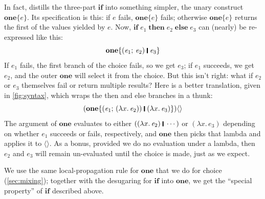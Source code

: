 \documentclass[acmsmall,review,anonymous,dvipsnames]{acmart}
\newcommand{\Varid}[1]{\mathit{#1}}
\begin{document}
In fact, \versecalc{} distills the three-part \ensuremath{\textbf{if}} into something simpler, the unary construct \ensuremath{\textbf{one}\{\Varid{e}\}}.
Its specification is this:
if \ensuremath{\Varid{e}} fails, \ensuremath{\textbf{one}\{\Varid{e}\}} fails; otherwise \ensuremath{\textbf{one}\{\Varid{e}\}} returns the first of the values yielded by \ensuremath{\Varid{e}}.
Now, \ensuremath{\textbf{if}\;\Varid{e}_{\mathrm{1}}\;\textbf{then}\;\Varid{e}_{\mathrm{2}}\;\textbf{else}\;\Varid{e}_{\mathrm{3}}} can (nearly) be re-expressed like this:
$$
\ensuremath{\textbf{one}\{(\Varid{e}_{\mathrm{1}};\,\Varid{e}_{\mathrm{2}})\;\rule[-0.3mm]{0.5mm}{2.5mm}\;\Varid{e}_{\mathrm{3}}\}}
$$
If \ensuremath{\Varid{e}_{\mathrm{1}}} fails, the first branch of the choice fails, so we get \ensuremath{\Varid{e}_{\mathrm{3}}}; if \ensuremath{\Varid{e}_{\mathrm{1}}} succeeds, we
get \ensuremath{\Varid{e}_{\mathrm{2}}}, and the outer \ensuremath{\textbf{one}} will select it from the choice.  But this isn't right:
what if \ensuremath{\Varid{e}_{\mathrm{2}}} or \ensuremath{\Varid{e}_{\mathrm{3}}} themselves fail or return multiple results?  Here is a better translation,
given in \cref{fig:syntax}, which wraps the then and else branches in a thunk:
$$
\ensuremath{(\textbf{one}\{(\Varid{e}_{\mathrm{1}};\,(\lambda x.\,\Varid{e}_{\mathrm{2}}))\;\rule[-0.3mm]{0.5mm}{2.5mm}\;(\lambda x.\,\Varid{e}_{\mathrm{3}})\})\langle\rangle}
$$
The argument of \ensuremath{\textbf{one}} evaluates to either \ensuremath{((\lambda x.\,\Varid{e}_{\mathrm{2}})\;\rule[-0.3mm]{0.5mm}{2.5mm}\;\cdots)} or \ensuremath{(\lambda x.\,\Varid{e}_{\mathrm{3}})}
depending on whether \ensuremath{\Varid{e}_{\mathrm{1}}} succeeds or fails, respectively, and \ensuremath{\textbf{one}} then picks that lambda and applies it to \ensuremath{\langle\rangle}.
As a bonus, provided we do no evaluation under a lambda, then \ensuremath{\Varid{e}_{\mathrm{2}}} and \ensuremath{\Varid{e}_{\mathrm{3}}} will
remain un-evaluated until the choice is made, just as we expect.

We use the same local-propagation rule for \ensuremath{\textbf{one}} that we do for choice (\cref{sec:mixing});
together with the desugaring for \ensuremath{\textbf{if}} into \ensuremath{\textbf{one}}, we get the ``special property'' of \ensuremath{\textbf{if}} described above.
\end{document}
